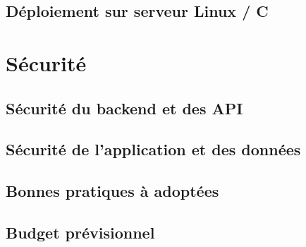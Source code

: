 \subsection{Déploiement sur serveur Linux / C}


\section{Sécurité}
\subsection{Sécurité du backend et des API}
\subsection{Sécurité de l'application et des données}
\subsection{Bonnes pratiques à adoptées}
\subsection{Budget prévisionnel}